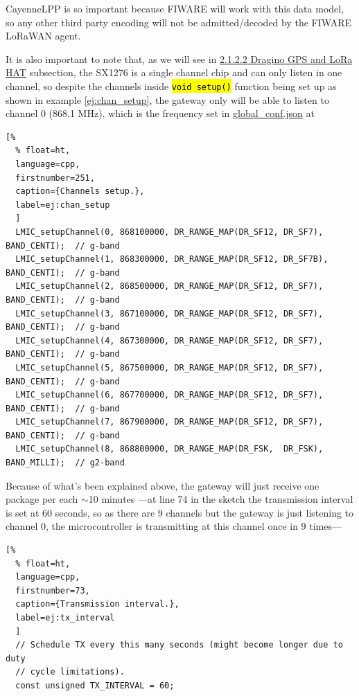 \documentclass[11pt,a4paper,dvipsnames,twoside]{article}
\newcommand{\cmd}[1] {\hl{\texttt{#1}}}
\begin{document}
CayenneLPP is so important because FIWARE will work with this data model, so any other third party encoding will not be admitted/decoded by the FIWARE LoRaWAN agent.

It is also important to note that, as we will see in \hyperlink{Raspi_HAT}{2.1.2.2 Dragino GPS and LoRa HAT} subsection, the SX1276 is a single channel chip and can only listen in one channel, so despite the channels inside \cmd{void setup()} function being set up as shown in example \ref{ej:chan_setup}, the gateway only will be able to listen to channel 0 (868.1 \si{\mega\hertz}), which is the frequency set in \href{https://github.com/dragino/dual_chan_pkt_fwd/blob/master/global_conf.json}{global\_conf.json} at \cite{Dragino_DualChannelController_Rpi}

\begin{lstlisting}[%
  % float=ht,
  language=cpp,
  firstnumber=251,
  caption={Channels setup.},
  label=ej:chan_setup
  ]
  LMIC_setupChannel(0, 868100000, DR_RANGE_MAP(DR_SF12, DR_SF7),  BAND_CENTI);  // g-band
  LMIC_setupChannel(1, 868300000, DR_RANGE_MAP(DR_SF12, DR_SF7B), BAND_CENTI);  // g-band
  LMIC_setupChannel(2, 868500000, DR_RANGE_MAP(DR_SF12, DR_SF7),  BAND_CENTI);  // g-band
  LMIC_setupChannel(3, 867100000, DR_RANGE_MAP(DR_SF12, DR_SF7),  BAND_CENTI);  // g-band
  LMIC_setupChannel(4, 867300000, DR_RANGE_MAP(DR_SF12, DR_SF7),  BAND_CENTI);  // g-band
  LMIC_setupChannel(5, 867500000, DR_RANGE_MAP(DR_SF12, DR_SF7),  BAND_CENTI);  // g-band
  LMIC_setupChannel(6, 867700000, DR_RANGE_MAP(DR_SF12, DR_SF7),  BAND_CENTI);  // g-band
  LMIC_setupChannel(7, 867900000, DR_RANGE_MAP(DR_SF12, DR_SF7),  BAND_CENTI);  // g-band
  LMIC_setupChannel(8, 868800000, DR_RANGE_MAP(DR_FSK,  DR_FSK),  BAND_MILLI);  // g2-band
\end{lstlisting}

Because of what's been explained above, the gateway will just receive one package per each $\sim$10 minutes ---at line 74 in the sketch the transmission interval is set at 60 seconds, so as there are 9 channels but the gateway is just listening to channel 0, the microcontroller is transmitting at this channel once in 9 times---

\begin{lstlisting}[%
  % float=ht,
  language=cpp,
  firstnumber=73,
  caption={Transmission interval.},
  label=ej:tx_interval
  ]
  // Schedule TX every this many seconds (might become longer due to duty
  // cycle limitations).
  const unsigned TX_INTERVAL = 60;
\end{lstlisting}
\end{document}
